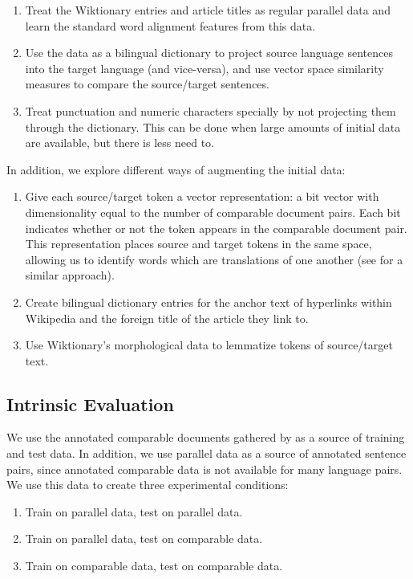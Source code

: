 \begin{enumerate}
\item Treat the Wiktionary entries and article titles as regular parallel data
and learn the standard word alignment features from this data.
\item Use the data as a bilingual dictionary to project source language
sentences into the target language (and vice-versa), and use vector space
similarity measures to compare the source/target sentences.
\item Treat punctuation and numeric characters specially by not projecting them
through the dictionary. This can be done when large amounts of initial data are
available, but there is less need to.
\end{enumerate}

In addition, we explore different ways of augmenting the initial data:

\begin{enumerate}
\item Give each source/target token a vector representation: a bit
vector with dimensionality equal to the number of comparable document pairs.
Each bit indicates whether or not the token appears in the comparable document
pair. This representation places source and target tokens in the same space,
allowing us to identify words which are translations of one another (see
\citet{Fung94} for a similar approach).
\item Create bilingual dictionary entries for the anchor text of hyperlinks
within Wikipedia and the foreign title of the article they link to.
\item Use Wiktionary's morphological data to lemmatize tokens of source/target text.
\end{enumerate}

\subsection{Intrinsic Evaluation}
We use the annotated comparable documents gathered by \citet{Smith10} as a source of
training and test data. In addition, we use parallel data as a source of
annotated sentence pairs, since annotated comparable data is not available for
many language pairs. We use this data to create three experimental conditions:

\begin{enumerate}
\item Train on parallel data, test on parallel data.
\item Train on parallel data, test on comparable data.
\item Train on comparable data, test on comparable data.
\end{enumerate}


